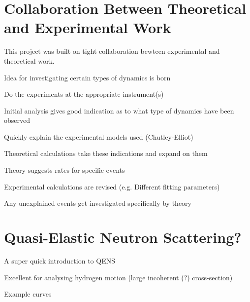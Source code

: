 \section{Collaboration Between Theoretical and Experimental Work}
\label{sec:cooperation}

This project was built on tight collaboration bewteen experimental and theoretical work.
\bit
\item Idea for investigating certain types of dynamics is born
\item Do the experiments at the appropriate instrument(s)
\item Initial analysis gives good indication as to what type of dynamics have been observed
\item Quickly explain the experimental models used (Chutley-Elliot)
\item Theoretical calculations take these indications and expand on them
\item Theory suggests rates for specific events
\item Experimental calculations are revised (e.g. Different fitting parameters)
\item Any unexplained events get investigated specifically by theory
\eit

\placeholder

\section{Quasi-Elastic Neutron Scattering?}
\label{sec:qens}
\bit
\item A super quick introduction to QENS
\item Excellent for analysing hydrogen motion (large incoherent (?) cross-section)
\item Example curves
\eit


\placeholder
